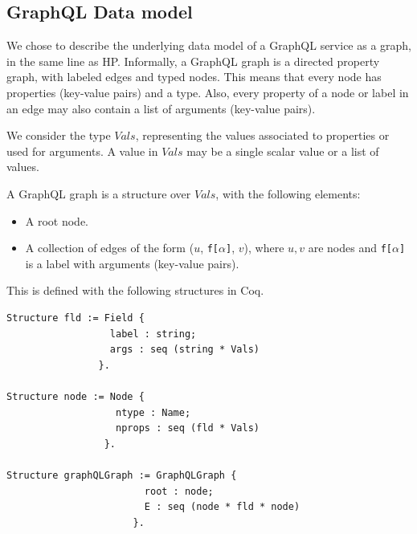 \subsection{GraphQL Data model}

We chose to describe the underlying data model of a GraphQL service as a graph, in the same line as HP. Informally, a GraphQL graph is a directed property graph, with labeled edges and typed nodes. This means that every node has properties (key-value pairs) and a type. Also, every property of a node or label in an edge may also contain a list of arguments (key-value pairs).

We consider the type $Vals$, representing the values associated to properties or used for arguments. A value in $Vals$ may be a single scalar value or a list of values.

\begin{definition}
A GraphQL graph is a structure over $Vals$, with the following elements:
\begin{itemize}
    \item A root node.
    \item A collection of edges of the form ($u$, \texttt{f[}$\alpha$\texttt{]}, $v$), where $u, v$ are nodes and \texttt{f[}$\alpha$\texttt{]} is a label with arguments (key-value pairs).
\end{itemize}
\end{definition}

This is defined with the following structures in Coq.

\begin{verbatim}
Structure fld := Field {
                  label : string;
                  args : seq (string * Vals)
                }.

Structure node := Node {
                   ntype : Name;
                   nprops : seq (fld * Vals)
                 }.

Structure graphQLGraph := GraphQLGraph {
                        root : node;
                        E : seq (node * fld * node)
                      }.
\end{verbatim}

